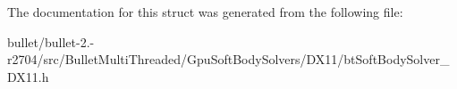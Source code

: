 The documentation for this struct was generated from the following file\+:\begin{DoxyCompactItemize}
\item 
bullet/bullet-\/2.-\/r2704/src/\+Bullet\+Multi\+Threaded/\+Gpu\+Soft\+Body\+Solvers/\+D\+X11/bt\+Soft\+Body\+Solver\+\_\+\+D\+X11.\+h\end{DoxyCompactItemize}
